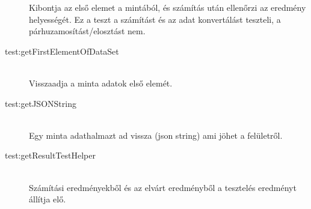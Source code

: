 \begin{description}
			Kibontja az első elemet a mintából, és számítás után ellenőrzi az eredmény helyességét. \newline
			Ez a teszt a számítást és az adat konvertálást teszteli, a párhuzamosítást/elosztást nem.
		\item[test:getFirstElementOfDataSet] \hfill \\
			Visszaadja a minta adatok első elemét.
		\item[test:getJSONString] \hfill \\
			Egy minta adathalmazt ad vissza (json string) ami jöhet a felületről.
		\item[test:getResultTestHelper] \hfill \\
			Számítási eredményekből és az elvárt eredményből a tesztelés eredményt állítja elő. 
	\end{description}

